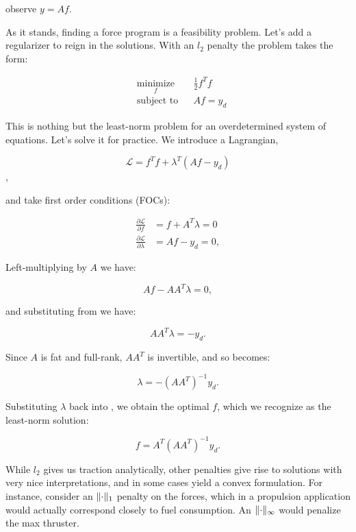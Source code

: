 \documentclass[12pt]{article}
\newcommand{\Lagr}{\mathcal{L}}
\DeclarePairedDelimiter{\norm}{\lVert}{\rVert}
\begin{document}
observe $y = A f$.

\bigbreak

As it stands, finding a force program is a feasibility problem. Let's add a regularizer to reign in the solutions. With an $l_2$ penalty the problem takes the form:

\bigbreak

\begin{equation}
\begin{aligned}
& \underset{f}{\text{minimize}}
& & \frac{1}{2} f^T f \\
& \text{subject to}
& & A f = y_d
\end{aligned}
\end{equation}

This is nothing but the least-norm problem for an overdetermined system of equations. Let's solve it for practice. We introduce a Lagrangian, 

\begin{equation}
\Lagr = f^T f + \lambda ^ T (A f - y_d)
\end{equation},

and take first order conditions (FOCs):

\begin{subequations}
    \begin{align}
    \frac{\partial \Lagr}{\partial f} &= f + A^T \lambda = 0  \label{eq:foca} \\
    \frac{\partial \Lagr}{\partial \lambda} &= A f - y_d = 0, \label{eq:focb}
    \end{align}
\end{subequations}

Left-multiplying  by $A$ we have:

\begin{equation}
Af - A A^T \lambda = 0, 
\end{equation}

and substituting from  we have: 

\begin{equation}
A A^T \lambda = -y_d. \label{eq:AATLambda}
\end{equation}

Since $A$ is fat and full-rank, $A A^T$ is invertible, and so  becomes: 

\begin{equation}
\lambda = -(A A^T)^{-1} y_d.
\end{equation}

Substituting $\lambda$ back into , we obtain the optimal $f$, which we recognize as the least-norm solution:

\begin{equation}
f = A^T (A A^T)^{-1} y_d.
\end{equation}

While $l_2$ gives us traction analytically, other penalties give rise to 
solutions with very nice interpretations, and in some cases yield a convex
formulation. For instance, consider an $\norm{\cdot}_1$ penalty on the forces, 
which in a propulsion application would actually correspond closely to fuel 
consumption. An $\norm{\cdot}_\infty$ would penalize the max thruster.
\end{document}
